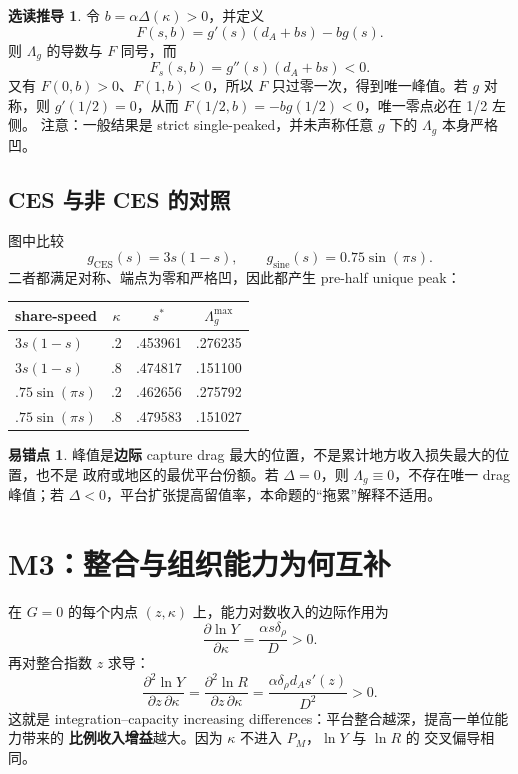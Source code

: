 \documentclass[UTF8,11pt,scheme=chinese,fontset=windows]{ctexart}
\theoremstyle{definition}
\newtheorem{commonerror}{易错点}[section]
\newtheorem{optionalmath}{选读推导}[section]
\begin{document}
\begin{optionalmath}
令 \(b=\alpha\Delta(\kappa)>0\)，并定义
\[
F(s,b)=g'(s)(d_A+bs)-bg(s).
\]
则 \(\Lambda_g\) 的导数与 \(F\) 同号，而
\[
F_s(s,b)=g''(s)(d_A+bs)<0.
\]
又有 \(F(0,b)>0\)、\(F(1,b)<0\)，所以 \(F\) 只过零一次，得到唯一峰值。若 \(g\)
对称，则 \(g'(1/2)=0\)，从而 \(F(1/2,b)=-bg(1/2)<0\)，唯一零点必在 1/2 左侧。
注意：一般结果是 strict single-peaked，并未声称任意 \(g\) 下的 \(\Lambda_g\) 本身严格凹。
\end{optionalmath}

\subsection{CES 与非 CES 的对照}

图中比较
\[
g_{\mathrm{CES}}(s)=3s(1-s),
\qquad
g_{\mathrm{sine}}(s)=0.75\sin(\pi s).
\]
二者都满足对称、端点为零和严格凹，因此都产生 pre-half unique peak：
\begin{center}
\small
\begin{tabular}{lccc}
\toprule
share-speed & \(\kappa\) & \(s^*\) & \(\Lambda_g^{\max}\) \\
\midrule
\(3s(1-s)\) & .2 & .453961 & .276235 \\
\(3s(1-s)\) & .8 & .474817 & .151100 \\
\(.75\sin(\pi s)\) & .2 & .462656 & .275792 \\
\(.75\sin(\pi s)\) & .8 & .479583 & .151027 \\
\bottomrule
\end{tabular}
\end{center}

\begin{commonerror}
峰值是\textbf{边际} capture drag 最大的位置，不是累计地方收入损失最大的位置，也不是
政府或地区的最优平台份额。若 \(\Delta=0\)，则 \(\Lambda_g\equiv0\)，不存在唯一 drag
峰值；若 \(\Delta<0\)，平台扩张提高留值率，本命题的“拖累”解释不适用。
\end{commonerror}

\section{M3：整合与组织能力为何互补}

在 \(G=0\) 的每个内点 \((z,\kappa)\) 上，能力对数收入的边际作用为
\[
\frac{\partial\ln Y}{\partial\kappa}
=\frac{\alpha s\delta_\rho}{D}>0.
\]
再对整合指数 \(z\) 求导：
\[
\boxed{
\frac{\partial^2\ln Y}{\partial z\,\partial\kappa}
=\frac{\partial^2\ln R}{\partial z\,\partial\kappa}
=\frac{\alpha\delta_\rho d_A s'(z)}{D^2}>0.}
\]
这就是 integration--capacity increasing differences：平台整合越深，提高一单位能力带来的
\textbf{比例收入增益}越大。因为 \(\kappa\) 不进入 \(P_M\)，\(\ln Y\) 与 \(\ln R\) 的
交叉偏导相同。
\end{document}
